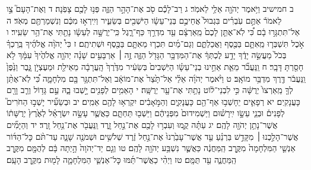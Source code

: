 \documentclass[twoside, openany, parskip=half, 11pt]{book}
\begin{document}
ב חמישיב וַיֹּ֥אמֶר יְהֹוָ֖ה אֵלַ֥י לֵאמֹֽר׃ ג רַב־לָכֶ֕ם סֹ֖ב אֶת־הָהָ֣ר הַזֶּ֑ה פְּנ֥וּ לָכֶ֖ם צָפֹֽנָה׃ ד וְאֶת־הָעָם֮ צַ֣ו לֵאמֹר֒ אַתֶּ֣ם עֹֽבְרִ֗ים בִּגְבוּל֙ אֲחֵיכֶ֣ם בְּנֵי־עֵשָׂ֔ו הַיֹּשְׁבִ֖ים בְּשֵׂעִ֑יר וְיִֽירְא֣וּ מִכֶּ֔ם וְנִשְׁמַרְתֶּ֖ם מְאֹֽד׃ ה אַל־תִּתְגָּר֣וּ בָ֔ם כִּ֠י לֹֽא־אֶתֵּ֤ן לָכֶם֙ מֵֽאַרְצָ֔ם עַ֖ד מִדְרַ֣ךְ כַּף־רָ֑גֶל כִּֽי־יְרֻשָּׁ֣ה לְעֵשָׂ֔ו נָתַ֖תִּי אֶת־הַ֥ר שֵׂעִֽיר׃ ו אֹ֣כֶל תִּשְׁבְּר֧וּ מֵֽאִתָּ֛ם בַּכֶּ֖סֶף וַאֲכַלְתֶּ֑ם וְגַם־מַ֜יִם תִּכְר֧וּ מֵאִתָּ֛ם בַּכֶּ֖סֶף וּשְׁתִיתֶֽם׃ ז כִּי֩ יְהֹוָ֨ה אֱלֹהֶ֜יךָ בֵּֽרַכְךָ֗ בְּכֹל֙ מַעֲשֵׂ֣ה יָדֶ֔ךָ יָדַ֣ע לֶכְתְּךָ֔ אֶת־הַמִּדְבָּ֥ר הַגָּדֹ֖ל הַזֶּ֑ה זֶ֣ה ׀ אַרְבָּעִ֣ים שָׁנָ֗ה יְהֹוָ֤ה אֱלֹהֶ֙יךָ֙ עִמָּ֔ךְ לֹ֥א חָסַ֖רְתָּ דָּבָֽר׃ ח וַֽנַּעֲבֹ֞ר מֵאֵ֧ת אַחֵ֣ינוּ בְנֵי־עֵשָׂ֗ו הַיֹּֽשְׁבִים֙ בְּשֵׂעִ֔יר מִדֶּ֙רֶךְ֙ הָֽעֲרָבָ֔ה מֵאֵילַ֖ת וּמֵעֶצְיֹ֣ן גָּ֑בֶר
וַנֵּ֙פֶן֙ וַֽנַּעֲבֹ֔ר דֶּ֖רֶךְ מִדְבַּ֥ר מוֹאָֽב׃ ט וַיֹּ֨אמֶר יְהֹוָ֜ה אֵלַ֗י אַל־תָּ֙צַר֙ אֶת־מוֹאָ֔ב וְאַל־תִּתְגָּ֥ר בָּ֖ם מִלְחָמָ֑ה כִּ֠י לֹֽא־אֶתֵּ֨ן לְךָ֤ מֵֽאַרְצוֹ֙ יְרֻשָּׁ֔ה כִּ֣י לִבְנֵי־ל֔וֹט נָתַ֥תִּי אֶת־עָ֖ר יְרֻשָּֽׁה׃ י הָאֵמִ֥ים לְפָנִ֖ים יָ֣שְׁבוּ בָ֑הּ עַ֣ם גָּד֥וֹל וְרַ֛ב וָרָ֖ם כָּעֲנָקִֽים׃ יא רְפָאִ֛ים יֵחָשְׁב֥וּ אַף־הֵ֖ם כָּעֲנָקִ֑ים וְהַמֹּ֣אָבִ֔ים יִקְרְא֥וּ לָהֶ֖ם אֵמִֽים׃ יב וּבְשֵׂעִ֞יר יָשְׁב֣וּ הַחֹרִים֮ לְפָנִים֒ וּבְנֵ֧י עֵשָׂ֣ו יִֽירָשׁ֗וּם וַיַּשְׁמִידוּם֙ מִפְּנֵיהֶ֔ם וַיֵּשְׁב֖וּ תַּחְתָּ֑ם כַּאֲשֶׁ֧ר עָשָׂ֣ה יִשְׂרָאֵ֗ל לְאֶ֙רֶץ֙ יְרֻשָּׁת֔וֹ אֲשֶׁר־נָתַ֥ן יְהֹוָ֖ה לָהֶֽם׃ יג עַתָּ֗ה קֻ֛מוּ וְעִבְר֥וּ לָכֶ֖ם אֶת־נַ֣חַל זָ֑רֶד וַֽנַּעֲבֹ֖ר אֶת־נַ֥חַל זָֽרֶד׃ יד וְהַיָּמִ֞ים אֲשֶׁר־הָלַ֣כְנוּ ׀ מִקָּדֵ֣שׁ בַּרְנֵ֗עַ עַ֤ד אֲשֶׁר־עָבַ֙רְנוּ֙ אֶת־נַ֣חַל זֶ֔רֶד שְׁלֹשִׁ֥ים וּשְׁמֹנֶ֖ה שָׁנָ֑ה עַד־תֹּ֨ם כׇּל־הַדּ֜וֹר אַנְשֵׁ֤י הַמִּלְחָמָה֙ מִקֶּ֣רֶב הַֽמַּחֲנֶ֔ה כַּאֲשֶׁ֛ר נִשְׁבַּ֥ע יְהֹוָ֖ה לָהֶֽם׃ טו וְגַ֤ם יַד־יְהֹוָה֙ הָ֣יְתָה בָּ֔ם לְהֻמָּ֖ם מִקֶּ֣רֶב הַֽמַּחֲנֶ֑ה עַ֖ד תֻּמָּֽם׃ טז וַיְהִ֨י כַאֲשֶׁר־תַּ֜מּוּ כׇּל־אַנְשֵׁ֧י הַמִּלְחָמָ֛ה לָמ֖וּת מִקֶּ֥רֶב הָעָֽם׃
\end{document}
